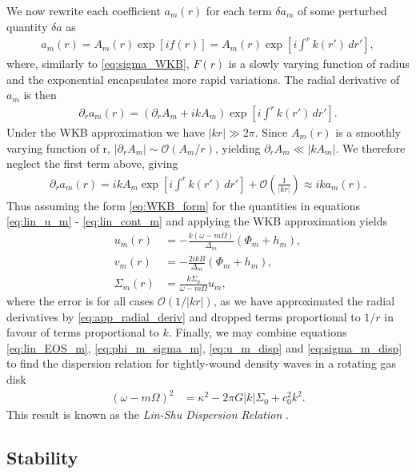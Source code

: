We now rewrite each coefficient $a_m(r)$ for each term $\delta a_m$ of some perturbed quantity $\delta a$ as
\begin{align}
    a_m(r) = A_m(r) \exp \left[ i f(r) \right] = A_m(r) \exp \left[ i \int^r k(r') \, dr' \right], \label{eq:WKB_form}
\end{align}
where, similarly to \ref{eq:sigma_WKB}, $F(r)$ is a slowly varying function of radius and the exponential encapsulates more rapid variations. 
The radial derivative of $a_m$ is then
\begin{align}
    \partial_r a_m(r) = \left( \partial_r A_m + ikA_m  \right) \exp \left[ i \int^r k(r') \, dr' \right].
\end{align}
Under the WKB approximation we have $|kr|\gg 2 \pi$.
Since $A_m(r)$ is a smoothly varying function of r, $|\partial_r A_m| \sim \mathcal{O}(A_m / r)$, yielding $\partial_r A_m \ll |k A_m|$.
We therefore neglect the first term above, giving
\begin{align}
    \partial_r a_m(r) = ikA_m \exp \left[ i \int^r k(r') \, dr' \right] + \mathcal{O}\left(\frac{1}{|kr|}\right) \approx ik a_m(r). \label{eq:app_radial_deriv}
\end{align}
Thus assuming the form \ref{eq:WKB_form} for the quantities in equations \ref{eq:lin_u_m} - \ref{eq:lin_cont_m} and applying the WKB approximation yields
\begin{align}
    u_m(r) &= - \frac{k(\omega-m\Omega)}{\Delta_m} (\Phi_m + h_m), \label{eq:u_m_disp} \\
    v_m(r) &= - \frac{2ikB}{\Delta_m} (\Phi_m + h_m), \label{eq:v_m_disp} \\
    \Sigma_m(r) &= \frac{k \Sigma_0}{\omega-m\Omega} u_m, \label{eq:sigma_m_disp}
\end{align}
where the error is for all cases $\mathcal{O}(1/|kr|)$, as we have approximated the radial derivatives by \ref{eq:app_radial_deriv} and dropped terms proportional to $1/r$ in favour of terms proportional to $k$.
Finally, we may combine equations \ref{eq:lin_EOS_m}, \ref{eq:phi_m_sigma_m}, \ref{eq:u_m_disp} and \ref{eq:sigma_m_disp} to find the dispersion relation for tightly-wound density waves in a rotating gas disk
\begin{align}
    \left( \omega - m \Omega  \right)^2 &= \kappa^2 - 2 \pi G |k| \Sigma_0 + c_0^2 k^2. \label{eq:lin_shu_disp}
\end{align}
This result is known as the \textit{Lin-Shu Dispersion Relation} \citep{lin1964}.

\subsection{Stability}

